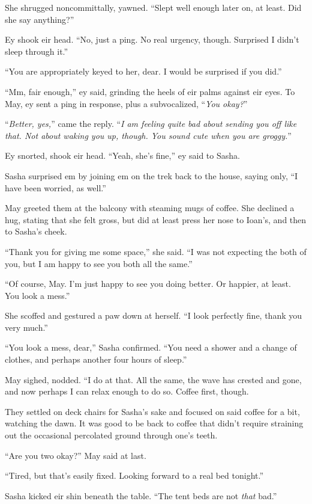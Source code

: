 She shrugged noncommittally, yawned. ``Slept well enough later on, at least. Did she say anything?''

Ey shook eir head. ``No, just a ping. No real urgency, though. Surprised I didn't sleep through it.''

``You are appropriately keyed to her, dear. I would be surprised if you did.''

``Mm, fair enough,'' ey said, grinding the heels of eir palms against eir eyes. To May, ey sent a ping in response, plus a subvocalized, ``\emph{You okay?}''

``\emph{Better, yes,}'' came the reply. ``\emph{I am feeling quite bad about sending you off like that. Not about waking you up, though. You sound cute when you are groggy.}''

Ey snorted, shook eir head. ``Yeah, she's fine,'' ey said to Sasha.

Sasha surprised em by joining em on the trek back to the house, saying only, ``I have been worried, as well.''

May greeted them at the balcony with steaming mugs of coffee. She declined a hug, stating that she felt gross, but did at least press her nose to Ioan's, and then to Sasha's cheek.

``Thank you for giving me some space,'' she said. ``I was not expecting the both of you, but I am happy to see you both all the same.''

``Of course, May. I'm just happy to see you doing better. Or happier, at least. You look a mess.''

She scoffed and gestured a paw down at herself. ``I look perfectly fine, thank you very much.''

``You look a mess, dear,'' Sasha confirmed. ``You need a shower and a change of clothes, and perhaps another four hours of sleep.''

May sighed, nodded. ``I do at that. All the same, the wave has crested and gone, and now perhaps I can relax enough to do so. Coffee first, though.

They settled on deck chairs for Sasha's sake and focused on said coffee for a bit, watching the dawn. It was good to be back to coffee that didn't require straining out the occasional percolated ground through one's teeth.

``Are you two okay?'' May said at last.

``Tired, but that's easily fixed. Looking forward to a real bed tonight.''

Sasha kicked eir shin beneath the table. ``The tent beds are not \emph{that} bad.''

